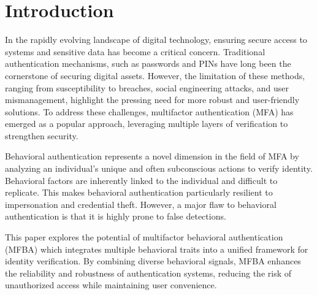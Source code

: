 
\section{Introduction}

In the rapidly evolving landscape of digital technology, ensuring secure access to systems and sensitive data has become a critical concern. Traditional authentication mechanisms, such as passwords and PINs have long been the cornerstone of securing digital assets. However, the limitation of these methods, ranging from susceptibility to breaches, social engineering attacks, and user mismanagement, highlight the pressing need for more robust and user-friendly solutions. To address these challenges, multifactor authentication (MFA) has emerged as a popular approach, leveraging multiple layers of verification to strengthen security.

Behavioral authentication represents a novel dimension in the field of MFA by analyzing an individual's unique and often subconscious actions to verify identity. Behavioral factors are inherently linked to the individual and difficult to replicate. This makes behavioral authentication particularly resilient to impersonation and credential theft. However, a major flaw to behavioral authentication is that it is highly prone to false detections.

This paper explores the potential of multifactor behavioral authentication (MFBA) which integrates multiple behavioral traits into a unified framework for identity verification. By combining diverse behavioral signals, MFBA enhances the reliability and robustness of authentication systems, reducing the risk of unauthorized access while maintaining user convenience.
